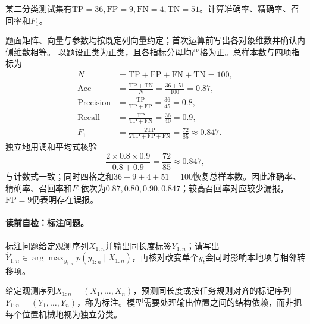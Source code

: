 \label{struct:V1-C11-CH18}
\label{struct:V1-C11-CH32}
\label{struct:V1-C11-CH33}
\begin{example}[混淆矩阵的四项分类指标]\label{exm:V1-C11-binary-metrics}
某二分类测试集有$\mathrm{TP}=36,\mathrm{FP}=9,\mathrm{FN}=4,\mathrm{TN}=51$。计算准确率、精确率、召回率和$F_1$。
\end{example}
\begin{solution}
\SolGiven 题面矩阵、向量与参数均按既定列向量约定；首次运算前写出各对象维数并确认内侧维数相等。
\SolDerive
以题设正类为正类，且各指标分母均严格为正。总样本数与四项指标为
\[
\begin{aligned}
N&=\mathrm{TP}+\mathrm{FP}+\mathrm{FN}+\mathrm{TN}=100,\\
\mathrm{Acc}
  &=\frac{\mathrm{TP}+\mathrm{TN}}{N}
    =\frac{36+51}{100}=0.87,\\
\mathrm{Precision}
  &=\frac{\mathrm{TP}}{\mathrm{TP}+\mathrm{FP}}
    =\frac{36}{45}=0.8,\\
\mathrm{Recall}
  &=\frac{\mathrm{TP}}{\mathrm{TP}+\mathrm{FN}}
    =\frac{36}{40}=0.9,\\
F_1
  &=\frac{2\mathrm{TP}}{2\mathrm{TP}+\mathrm{FP}+\mathrm{FN}}
    =\frac{72}{85}\approx0.847.
\end{aligned}
\]
独立地用调和平均式核验
\[
\frac{2\times0.8\times0.9}{0.8+0.9}
=\frac{72}{85}\approx0.847,
\]
与计数式一致；同时四格之和$36+9+4+51=100$恢复总样本数。因此准确率、精确率、召回率和$F_1$依次为$0.87,0.80,0.90,0.847$；较高召回率对应较少漏报，$\mathrm{FP}=9$仍表明存在误报。
\end{solution}


\paragraph{读前自检：标注问题。}标注问题给定观测序列$X_{1:n}$并输出同长度标签$Y_{1:n}$；请写出$\widehat Y_{1:n}\in\arg\max_{y_{1:n}}p(y_{1:n}\mid X_{1:n})$，再核对改变单个$y_t$会同时影响本地项与相邻转移项。\par

\begin{definition}[序列标注]
给定观测序列$X_{1:n}=(X_1,\ldots,X_n)$，预测同长度或按任务规则对齐的标记序列$Y_{1:n}=(Y_1,\ldots,Y_n)$，称为标注。模型需要处理输出位置之间的结构依赖，而非把每个位置机械地视为独立分类。
\end{definition}


